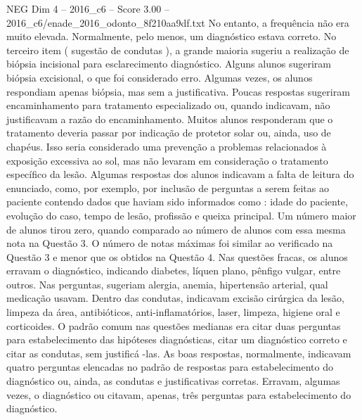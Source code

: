 \begin{textsample}{NEG Dim 4 – 2016\_c6 – Score 3.00 – 2016\_c6/enade\_2016\_odonto\_8f210aa9df.txt}
No entanto, a frequência não era muito elevada.
Normalmente, pelo menos, um diagnóstico estava correto.
No terceiro item ( sugestão de condutas ), a grande maioria sugeriu a realização de biópsia incisional para esclarecimento diagnóstico.
Alguns alunos sugeriram biópsia excisional, o que foi considerado erro.
Algumas vezes, os alunos respondiam apenas biópsia, mas sem a justificativa.
Poucas respostas sugeriram encaminhamento para tratamento especializado ou, quando indicavam, não justificavam a razão do encaminhamento.
Muitos alunos responderam que o tratamento deveria passar por indicação de protetor solar ou, ainda, uso de chapéus.
Isso seria considerado uma prevenção a problemas relacionados à exposição excessiva ao sol, mas não levaram em consideração o tratamento específico da lesão.
Algumas respostas dos alunos indicavam a falta de leitura do enunciado, como, por exemplo, por inclusão de perguntas a serem feitas ao paciente contendo dados que haviam sido informados como : idade do paciente, evolução do caso, tempo de lesão, profissão e queixa principal.
Um número maior de alunos tirou zero, quando comparado ao número de alunos com essa mesma nota na Questão 3.
O número de notas máximas foi similar ao verificado na Questão 3 e menor que os obtidos na Questão 4.
Nas questões fracas, os alunos erravam o diagnóstico, indicando diabetes, líquen plano, pênfigo vulgar, entre outros.
Nas perguntas, sugeriam alergia, anemia, hipertensão arterial, qual medicação usavam.
Dentro das condutas, indicavam excisão cirúrgica da lesão, limpeza da área, antibióticos, anti-inflamatórios, laser, limpeza, higiene oral e corticoides.
O padrão comum nas questões medianas era citar duas perguntas para estabelecimento das hipóteses diagnósticas, citar um diagnóstico correto e citar as condutas, sem justificá -las.
As boas respostas, normalmente, indicavam quatro perguntas elencadas no padrão de respostas para estabelecimento do diagnóstico ou, ainda, as condutas e justificativas corretas.
Erravam, algumas vezes, o diagnóstico ou citavam, apenas, três perguntas para estabelecimento do diagnóstico.

\end{textsample}
